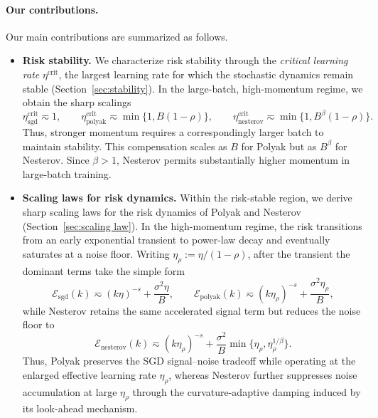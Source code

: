 \documentclass[11pt]{article}
\newcommand{\sgd}{\mathrm{sgd}}
\newcommand{\polyak}{\mathrm{polyak}}
\newcommand{\nesterov}{\mathrm{nesterov}}
\newcommand{\crit}{\mathrm{crit}}
\begin{document}
\paragraph{Our contributions.}
Our main contributions are summarized as follows.
\begin{itemize}
  \vspace{-.3em}
\item \textbf{Risk stability.}
We characterize risk stability through the \emph{critical learning rate} \(\eta^{\crit}\), the largest learning rate for which the stochastic dynamics remain stable (Section~\ref{sec:stability}). In the large-batch, high-momentum regime, we obtain the sharp scalings
\begin{equation}\label{eqn: stability-0}
\eta_{\sgd}^{\crit}\eqsim 1,\qquad
\eta_{\polyak}^{\crit}\eqsim \min\{1,B(1-\rho)\},\qquad
\eta_{\nesterov}^{\crit}\eqsim \min\{1,B^\beta(1-\rho)\}.
\end{equation}
Thus, stronger momentum requires a correspondingly larger batch to maintain stability. This compensation scales as \(B\) for Polyak but as \(B^\beta\) for Nesterov. Since \(\beta>1\), Nesterov permits substantially higher momentum in large-batch training.

\item \textbf{Scaling laws for risk dynamics.}
Within the risk-stable region, we derive sharp scaling laws for the risk dynamics of Polyak and Nesterov (Section~\ref{sec:scaling law}). In the high-momentum regime, the risk transitions from an early exponential transient to power-law decay and eventually saturates at a noise floor. Writing \(\eta_\rho:=\eta/(1-\rho)\), after the transient the dominant terms take the simple form
\[
\mathcal E_{\sgd}(k)\eqsim(k\eta)^{-s}+\frac{\sigma^2\eta}{B},\qquad \mathcal E_{\polyak}(k)\eqsim(k\eta_\rho)^{-s}+\frac{\sigma^2\eta_\rho}{B},
\]
while Nesterov retains the same accelerated signal term but reduces the noise floor to
\[
\mathcal E_{\nesterov}(k)\eqsim(k\eta_\rho)^{-s}+\frac{\sigma^2}{B}\min\{\eta_\rho,\eta_\rho^{1/\beta}\}.
\]
Thus, Polyak preserves the SGD signal--noise tradeoff while operating at the enlarged effective learning rate \(\eta_\rho\), whereas Nesterov further suppresses noise accumulation at large \(\eta_\rho\) through the curvature-adaptive damping induced by its look-ahead mechanism.


\end{itemize}
\end{document}
